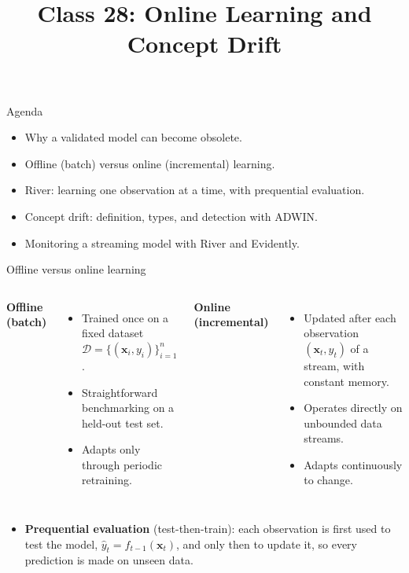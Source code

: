 
\usepackage{amssymb}

\title{Class 28: Online Learning and Concept Drift}
\author{\coursename}
\date{}



\frame{\titlepage \coursefooter}

\begin{frame}{Agenda}
\begin{itemize}
\item Why a validated model can become obsolete.
\item Offline (batch) versus online (incremental) learning.
\item River: learning one observation at a time, with prequential evaluation.
\item Concept drift: definition, types, and detection with ADWIN.
\item Monitoring a streaming model with River and Evidently.
\end{itemize}
\coursefooter
\end{frame}

\begin{frame}{Offline versus online learning}
\begin{columns}[T]
\textbf{Offline (batch)}
\begin{itemize}
\item Trained once on a fixed dataset $\mathcal{D} = \{(\mathbf{x}_i, y_i)\}_{i=1}^{n}$.
\item Straightforward benchmarking on a held-out test set.
\item Adapts only through periodic retraining.
\end{itemize}
\textbf{Online (incremental)}
\begin{itemize}
\item Updated after each observation $(\mathbf{x}_t, y_t)$ of a stream, with constant memory.
\item Operates directly on unbounded data streams.
\item Adapts continuously to change.
\end{itemize}
\end{columns}
\vspace{0.6em}
\begin{itemize}
\item \textbf{Prequential evaluation} (test-then-train): each observation is first used to test the model, $\hat{y}_t = f_{t-1}(\mathbf{x}_t)$, and only then to update it, so every prediction is made on unseen data.
\end{itemize}
\coursefooter
\end{frame}

